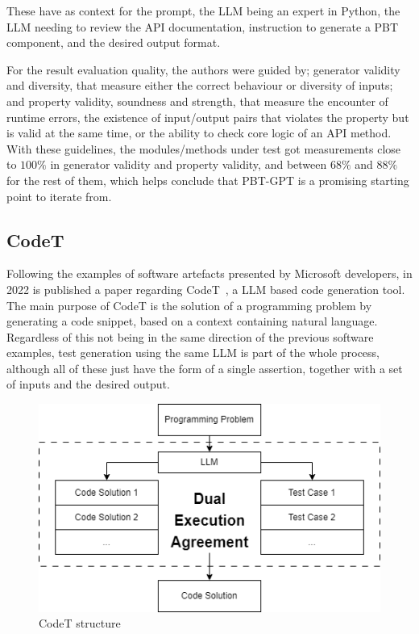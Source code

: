 \documentclass[%
  chapterprefix=false,%
  open=right,%
  twoside=true,%
  paper=a4,%
  logofile={Figures/logo.png},%
  thesistype=master,%
  UKenglish,%
]{se2thesis}
\begin{document}
These have as context for the prompt, the LLM being an expert in Python, the LLM needing to review the API documentation, instruction to generate a PBT component, and the desired output format.

For the result evaluation quality, the authors were guided by; generator validity and diversity, that measure either the correct behaviour or diversity of inputs; and property validity, soundness and strength, that measure the encounter of runtime errors, the existence of input/output pairs that violates the property but is valid at the same time, or the ability to check core logic of an API method.
With these guidelines, the modules/methods under test got measurements close to \(100\%\) in generator validity and property validity, and between \(68\%\) and \(88\%\) for the rest of them, which helps conclude that PBT-GPT is a promising starting point to iterate from.
\subsection{CodeT}

Following the examples of software artefacts presented by Microsoft developers, in 2022 is published a paper regarding CodeT~\cite{DBLP:journals/corr/abs-2207-10397}, a LLM based code generation tool.
The main purpose of CodeT is the solution of a programming problem by generating a code snippet, based on a context containing natural language.
Regardless of this not being in the same direction of the previous software examples, test generation using the same LLM is part of the whole process, although all of these just have the form of a single assertion, together with a set of inputs and the desired output.

\begin{figure}[tb]
  \centering 
  \includegraphics[width=.99\textwidth]{Figures/codet.png}
  \caption{CodeT structure}\label{fig:codet}
\end{figure}
\end{document}
